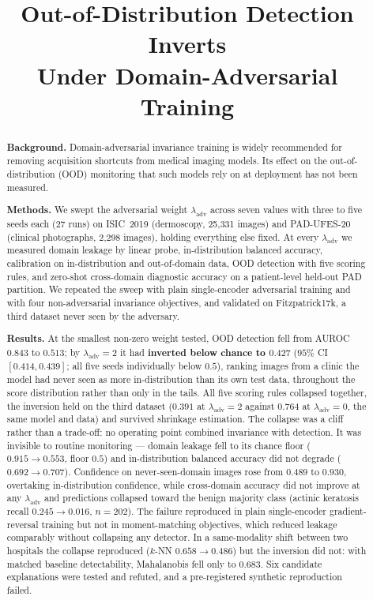 \documentclass[11pt,a4paper]{article}
\title{\textbf{Out-of-Distribution Detection Inverts\\
Under Domain-Adversarial Training}}
\author{\pending{author list and affiliations}}
\date{}
\newcommand{\lam}{\lambda_{\mathrm{adv}}}
\newcommand{\nAK}{202}      %
\begin{document}
\maketitle

\begin{abstract}
\noindent\textbf{Background.} Domain-adversarial invariance training is widely
recommended for removing acquisition shortcuts from medical imaging models.
Its effect on the out-of-distribution (OOD) monitoring that such models rely
on at deployment has not been measured.

\noindent\textbf{Methods.} We swept the adversarial weight $\lam$ across seven
values with three to five seeds each (27 runs) on ISIC~2019 (dermoscopy,
25{,}331 images) and PAD-UFES-20 (clinical photographs, 2{,}298 images),
holding everything else fixed. At every $\lam$ we measured domain leakage by
linear probe, in-distribution balanced accuracy, calibration on in-distribution
and out-of-domain data, OOD detection with five scoring rules, and zero-shot
cross-domain diagnostic accuracy on a patient-level held-out PAD partition. We
repeated the sweep with plain single-encoder adversarial training and with four
non-adversarial invariance objectives, and validated on Fitzpatrick17k, a third
dataset never seen by the adversary.

\noindent\textbf{Results.} At the smallest non-zero weight tested, OOD detection
fell from AUROC $0.843$ to $0.513$; by $\lam = 2$ it had \textbf{inverted below
chance to $0.427$} ($95\%$ CI $[0.414, 0.439]$; all five seeds individually below
$0.5$), ranking images from a clinic the model had never seen as
more in-distribution than its own test data, throughout the score distribution
rather than only in the tails. All five scoring rules collapsed together, the
inversion held on the third dataset ($0.391$ at $\lam = 2$ against $0.764$ at
$\lam = 0$, the same model and data) and survived shrinkage estimation. The collapse was a
cliff rather than a trade-off: no operating point combined invariance with
detection. It was invisible to routine monitoring --- domain leakage fell to its
chance floor ($0.915 \to 0.553$, floor $0.5$) and in-distribution balanced
accuracy did not degrade ($0.692 \to 0.707$). Confidence on never-seen-domain
images rose from $0.489$ to $0.930$, overtaking in-distribution confidence,
while cross-domain accuracy did not improve at any $\lam$ and predictions
collapsed toward the benign majority class (actinic keratosis recall
$0.245 \to 0.016$, $n = \nAK$). The failure reproduced in plain single-encoder
gradient-reversal training but not in moment-matching objectives, which reduced
leakage comparably without collapsing any detector. In a same-modality shift between
two hospitals the collapse reproduced ($k$-NN $0.658 \to 0.486$) but the inversion did
not: with matched baseline detectability, Mahalanobis fell only to $0.683$. Six
candidate explanations were tested and
refuted, and a pre-registered synthetic reproduction failed.


\end{abstract}
\end{document}
